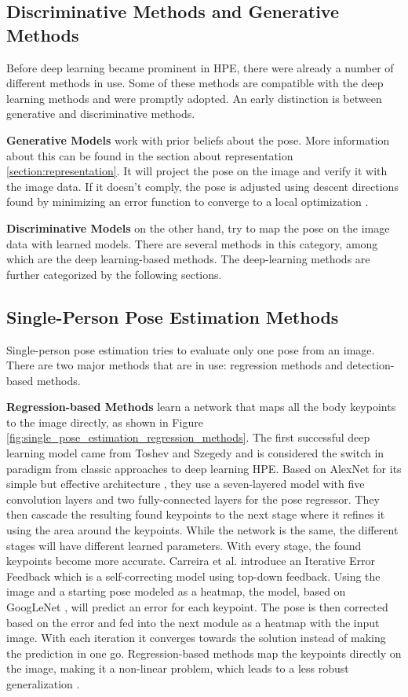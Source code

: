 \subsection{Discriminative Methods and Generative Methods}
Before deep learning became prominent in HPE, there were already a number of different methods in use.
Some of these methods are compatible with the deep learning methods and were promptly adopted.
An early distinction is between generative and discriminative methods.

\textbf{Generative Models} work with prior beliefs about the pose.
More information about this can be found in the section about representation \ref{section:representation}.
It will project the pose on the image and verify it with the image data.
If it doesn't comply, the pose is adjusted using descent directions found by minimizing an error function to converge to a local optimization \cite{Pons-Moll2011}.

\textbf{Discriminative Models} on the other hand, try to map the pose on the image data with learned models.
There are several methods in this category, among which are the deep learning-based methods.
The deep-learning methods are further categorized by the following sections.

\subsection{Single-Person Pose Estimation Methods}
Single-person pose estimation tries to evaluate only one pose from an image.
There are two major methods that are in use: regression methods and detection-based methods.

\textbf{Regression-based Methods} learn a network that maps all the body keypoints to the image directly, as shown in Figure \ref{fig:single_pose_estimation_regression_methods}.
The first successful deep learning model came from Toshev and Szegedy \cite{Toshev2014} and is considered the switch in paradigm from classic approaches to deep learning HPE.
Based on AlexNet for its simple but effective architecture \cite{AlexNet}, they use a seven-layered model with five convolution layers and two fully-connected layers for the pose regressor.
They then cascade the resulting found keypoints to the next stage where it refines it using the area around the keypoints.
While the network is the same, the different stages will have different learned parameters.
With every stage, the found keypoints become more accurate.
Carreira et al. \cite{CarreiraAFM15} introduce an Iterative Error Feedback which is a self-correcting model using top-down feedback.
Using the image and a starting pose modeled as a heatmap, the model, based on GoogLeNet \cite{googlenet}, will predict an error for each keypoint.
The pose is then corrected based on the error and fed into the next module as a heatmap with the input image.
With each iteration it converges towards the solution instead of making the prediction in one go.
Regression-based methods map the keypoints directly on the image, making it a non-linear problem, which leads to a less robust generalization \cite{Liu2104}.

